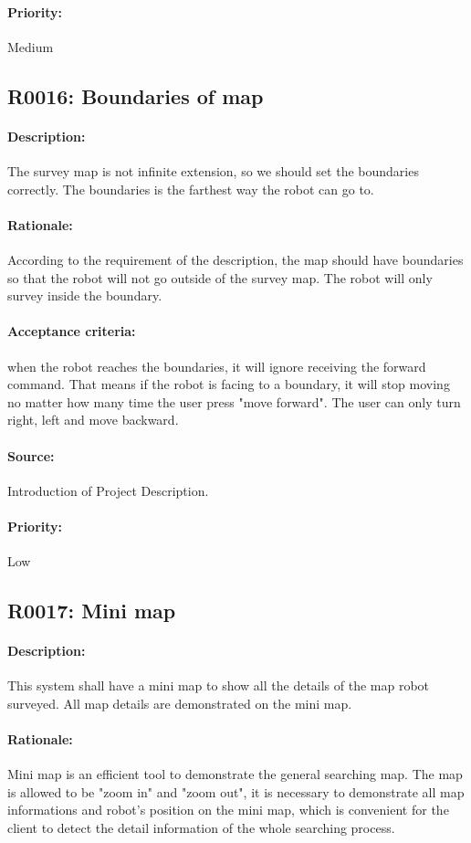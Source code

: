 \documentclass[11pt, a4paper]{report}
\begin{document}
\paragraph{Priority:}
Medium


\subsection{R0016: Boundaries of map}
\paragraph{Description:}
The survey map is not infinite extension, so we should set the boundaries correctly. The boundaries is the farthest way the robot can go to.
\paragraph{Rationale:}
According to the requirement of the description, the map should have boundaries so that the robot will not go outside of the survey map. The robot will only survey inside the boundary.
\paragraph{Acceptance criteria:}
when the robot reaches the boundaries, it will ignore receiving the forward command. That means if the robot is facing to a boundary, it will stop moving no matter how many time the user press "move forward". The user can only turn right, left and move backward.
\paragraph{Source:}
 Introduction of Project Description.
\paragraph{Priority:}
Low


\subsection{R0017: Mini map}
\paragraph{Description:}
This system shall have a mini map to show all the details of the map robot surveyed. All map details are demonstrated on the mini map. 
\paragraph{Rationale:}
Mini map is an efficient tool to demonstrate the general searching map. The map is allowed to be "zoom in" and "zoom out", it is necessary to demonstrate all map informations and robot's position on the mini map, which is convenient for the client to detect the detail information of the whole searching process.    
\end{document}
